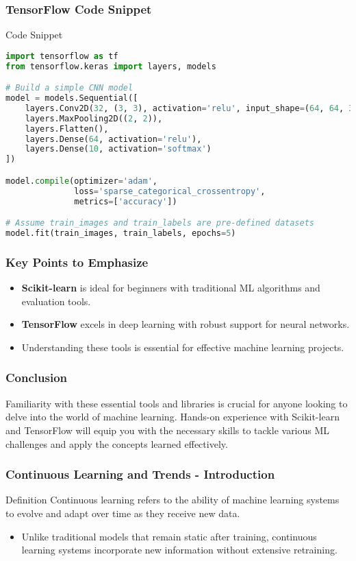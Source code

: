 \documentclass{beamer}
\begin{document}
\begin{frame}[fragile]
    \frametitle{TensorFlow Code Snippet}
    \begin{block}{Code Snippet}
        \begin{lstlisting}[language=Python]
import tensorflow as tf
from tensorflow.keras import layers, models

# Build a simple CNN model
model = models.Sequential([
    layers.Conv2D(32, (3, 3), activation='relu', input_shape=(64, 64, 3)),
    layers.MaxPooling2D((2, 2)),
    layers.Flatten(),
    layers.Dense(64, activation='relu'),
    layers.Dense(10, activation='softmax')
])

model.compile(optimizer='adam',
              loss='sparse_categorical_crossentropy',
              metrics=['accuracy'])

# Assume train_images and train_labels are pre-defined datasets
model.fit(train_images, train_labels, epochs=5)
        \end{lstlisting}
    \end{block}
\end{frame}

\begin{frame}
    \frametitle{Key Points to Emphasize}
    \begin{itemize}
        \item \textbf{Scikit-learn} is ideal for beginners with traditional ML algorithms and evaluation tools.
        \item \textbf{TensorFlow} excels in deep learning with robust support for neural networks.
        \item Understanding these tools is essential for effective machine learning projects.
    \end{itemize}
\end{frame}

\begin{frame}
    \frametitle{Conclusion}
    Familiarity with these essential tools and libraries is crucial for anyone looking to delve into the world of machine learning. Hands-on experience with Scikit-learn and TensorFlow will equip you with the necessary skills to tackle various ML challenges and apply the concepts learned effectively.
\end{frame}

\begin{frame}[fragile]
    \frametitle{Continuous Learning and Trends - Introduction}
    \begin{block}{Definition}
        Continuous learning refers to the ability of machine learning systems to evolve and adapt over time as they receive new data.
    \end{block}
    \begin{itemize}
        \item Unlike traditional models that remain static after training, continuous learning systems incorporate new information without extensive retraining.
    \end{itemize}
\end{frame}
\end{document}
